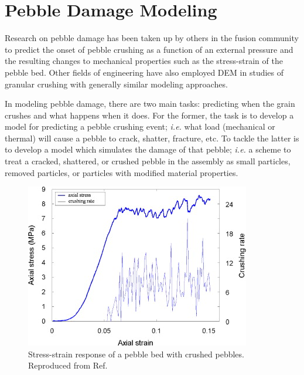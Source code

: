 \section{Pebble Damage Modeling}\label{sec:failure-study}
Research on pebble damage has been taken up by others in the fusion community to predict the onset of pebble crushing as a function of an external pressure and the resulting changes to mechanical properties such as the stress-strain of the pebble bed.\cite{Annabattula2012a, Zhao2012, Zhao2013} Other fields of engineering have also employed DEM in studies of granular crushing with generally similar modeling approaches.\cite{Marketos2007,Pitchumani2004}


In modeling pebble damage, there are two main tasks: predicting when the grain crushes and what happens when it does. For the former, the task is to develop a model for predicting a pebble crushing event; \textit{i.e.} what load (mechanical or thermal) will cause a pebble to crack, shatter, fracture, etc. To tackle the latter is to develop a model which simulates the damage of that pebble; \textit{i.e.} a scheme to treat a cracked, shattered, or crushed pebble in the assembly as small particles, removed particles, or particles with modified material properties.

\begin{figure}[!t]
\centering
	\includegraphics[]{chapters/figures/markets-bolton-stress-strain-crushing.jpg}
	\caption{Stress-strain response of a pebble bed with crushed pebbles. Reproduced from Ref.~\cite{Marketos2007}}
	\label{fig:marketos-bolton-stress-strain}
\end{figure}

